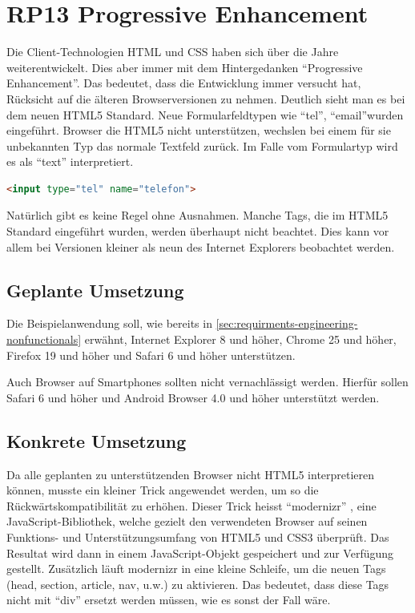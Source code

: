 \section{RP13 Progressive Enhancement}
\label{sec:principle-rp13-progressive-enhancement}

Die Client-Technologien HTML und CSS haben sich über die Jahre weiterentwickelt. Dies aber immer mit dem Hintergedanken ``Progressive Enhancement''. Das bedeutet, dass die Entwicklung immer versucht hat, Rücksicht auf die älteren Browserversionen zu nehmen.
Deutlich sieht man es bei dem neuen HTML5 Standard. Neue Formularfeldtypen wie ``tel'', ``email''wurden eingeführt. Browser die HTML5 nicht unterstützen, wechslen bei einem für sie unbekannten Typ das normale Textfeld zurück. Im Falle vom Formulartyp wird es als ``text'' interpretiert.

\begin{lstlisting}[language=HTML, caption={Formularfeld mit HTML5, welches eine Telefonnummer erwartet}, label={lst:html5TelInput}]
<input type="tel" name="telefon">
\end{lstlisting}

Natürlich gibt es keine Regel ohne Ausnahmen. Manche Tags, die im HTML5 Standard eingeführt wurden, werden überhaupt nicht beachtet. Dies kann vor allem bei Versionen kleiner als neun des Internet Explorers beobachtet werden.

\subsection*{Geplante Umsetzung}
Die Beispielanwendung soll, wie bereits in \ref{sec:requirments-engineering-nonfunctionals} erwähnt, Internet Explorer 8 und höher, Chrome 25 und höher, Firefox 19 und höher und Safari 6 und höher unterstützen.

Auch Browser auf Smartphones sollten nicht vernachlässigt werden. Hierfür sollen Safari 6 und höher und Android Browser 4.0 und höher unterstützt werden.

\subsection*{Konkrete Umsetzung}
Da alle geplanten zu unterstützenden Browser nicht HTML5 interpretieren können, musste ein kleiner Trick angewendet werden, um so die Rückwärtskompatibilität zu erhöhen. Dieser Trick heisst ``modernizr'' \cite{modernizr}, eine JavaScript-Bibliothek, welche gezielt den verwendeten Browser auf seinen Funktions- und Unterstützungsumfang von HTML5 und CSS3 überprüft. Das Resultat wird dann in einem JavaScript-Objekt gespeichert und zur Verfügung gestellt.  Zusätzlich läuft modernizr in eine kleine Schleife, um die neuen Tags (head, section, article, nav, u.w.) zu aktivieren. Das bedeutet, dass diese Tags nicht mit ``div'' ersetzt werden müssen, wie es sonst der Fall wäre.

